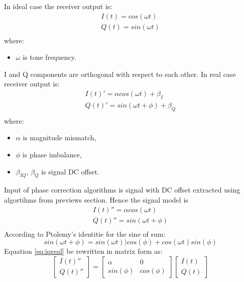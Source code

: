 \documentclass[en,printmode]{mgr}
\begin{document}
	    In ideal case the receiver output is:
		\begin{equation}
			\renewcommand*{\arraystretch}{1.3} 
			\begin{array}{ll}
				I(t) = cos(\omega t) \\
				Q(t) = sin(\omega t) \\
			\end{array}
		\end{equation}
		where:
		\begin{itemize}
			\item $\omega$ is tone frequency.
		\end{itemize}
	    I and Q components are orthogonal with respect to each other.
	    In real case receiver output is:
		\begin{equation}
			\renewcommand*{\arraystretch}{1.3} 
			\begin{array}{ll}
				I(t)' = \alpha cos(\omega t) + \beta_I \\
				Q(t)' = sin(\omega t + \phi) + \beta_Q \\
			\end{array}
		\end{equation}
		where:
		\begin{itemize}
			\item $\alpha$ is magnitude mismatch,
			\item $\phi$ is phase imbalance,
			\item $\beta_{IQ}$, $\beta_{Q}$ is signal DC offset.
		\end{itemize}
		Input of phase correction algorithms is signal with DC offset extracted using algortihms
		from previews section. Hence the signal model is \cite{iqcorr}
		\begin{equation}
			\renewcommand*{\arraystretch}{1.3} 
			\begin{array}{ll}
				I(t)'' = \alpha cos(\omega t) \\
				Q(t)'' = sin(\omega t + \phi) \\
			\end{array} \label{eq:iqreal}
		\end{equation}
		According to Ptolemy’s identitie for the sine of sum:
		\[
			sin\left(\omega t + \phi\right) = 
			sin\left(\omega t\right))cos\left(\phi \right) + 
			cos\left(\omega t\right) sin\left(\phi \right)
		\] 
		Equation \ref{eq:iqreal} be rewritten in matrix form as:
		\begin{equation}
			\begin{bmatrix}
				I(t)'' \\
				Q(t)''
			\end{bmatrix}
			=
			\begin{bmatrix}
				\alpha & 0 \\
				sin(\phi) & cos(\phi)
			\end{bmatrix}
			\begin{bmatrix}
				I(t) \\
				Q(t)
			\end{bmatrix} \label{eq:iqrealmat}
		\end{equation}
\end{document}

